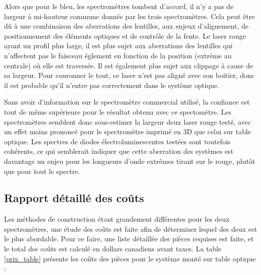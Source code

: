 \documentclass[11pt,letterpaper]{article}
\begin{document}
Alors que pour le bleu, les spectromètres tombent d'accord, il n'y a pas de largeur à mi-hauteur
commune donnée par les trois spectromètres. Cela peut être dû à une combinaison des aberrations 
des lentilles, aux enjeux d'alignement, de positionnement des éléments optiques et de contrôle de
la fente. Le laser rouge ayant un profil plus large, il est plus sujet aux aberrations des lentilles
qui n'affectent pas le faisceau églement en fonction de la position (extrême au centrale) où elle
est traversée. Il est également plus sujet aux clippage à cause de sa largeur. Pour couronner le tout,
ce laser n'est pas aligné avec son boitier, donc il est probable qu'il n'entre pas correctement dans
le système optique. 

Sans avoir d'information sur le spectromètre commercial utilisé, la confiance est tout de même supérieure
pour le résultat obtenu avec ce spectomètre. Les spectromètres semblent donc sous-estimer la largeur deux
laser rouge testé, avec un effet moins prononcé pour le spectromètre imprimé en 3D que celui sur table optique.
Les spectres de diodes électroluminescentes testées sont toutefois cohérents, ce qui semblerait indiquer que 
cette aberration des systèmes est davantage un enjeu pour les longueurs d'onde extrêmes tirant sur le rouge,
plutôt que pour tout le spectre. 




\subsection{Rapport détaillé des coûts}

Les méthodes de construction étant grandement différentes pour les deux spectromètres, une 
étude des coûts est faite afin de déterminer lequel des deux est le plus abordable. Pour ce
faire, une liste détaillée des pièces requises est faite, et le total des coûts est calculé en
dollars canadiens avant taxes. La table \ref{prix_table} présente les coûts des pièces pour
le système monté sur table optique :
\end{document}
